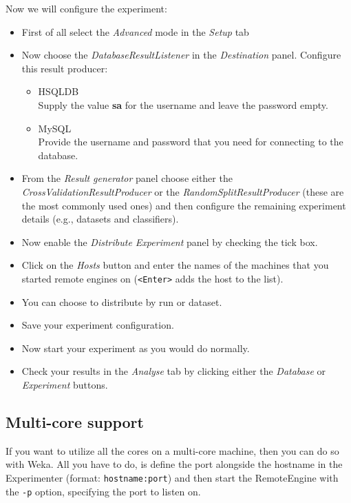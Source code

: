 Now we will configure the experiment:

\begin{itemize}
   \item First of all select the \textit{Advanced} mode in the \textit{Setup} tab
   \item Now choose the \textit{DatabaseResultListener} in the \textit{Destination} panel. Configure this result producer:
   	\begin{itemize}
    		\item HSQLDB \\ Supply the value \textbf{sa} for the username and leave the password empty.
    		\item MySQL \\ Provide the username and password that you need for connecting to the database.
    	\end{itemize}
   \item From the \textit{Result generator} panel choose either the \textit{CrossValidationResultProducer} or the \textit{RandomSplitResultProducer} (these are the most commonly used ones) and then configure the remaining experiment details (e.g., datasets and classifiers).
   \item Now enable the \textit{Distribute Experiment} panel by checking the tick box.
   \item Click on the \textit{Hosts} button and enter the names of the machines that you started remote engines on (\texttt{<Enter>} adds the host to the list).
   \item You can choose to distribute by run or dataset.
   \item Save your experiment configuration.
   \item Now start your experiment as you would do normally.
   \item Check your results in the \textit{Analyse} tab by clicking either the \textit{Database} or \textit{Experiment} buttons.
\end{itemize}


\subsection{Multi-core support}
If you want to utilize all the cores on a multi-core machine, then you can do so with Weka. All you have to do, is define the port alongside the hostname in the Experimenter (format: \texttt{hostname:port}) and then start the RemoteEngine with the \texttt{-p} option, specifying the port to listen on.


